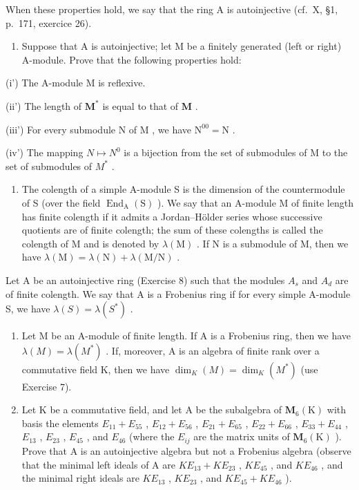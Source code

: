 When these properties hold, we say that the ring A is autoinjective (cf.~X, §1, p.~171, exercice 26).

\begin{enumerate}
\def\labelenumi{\alph{enumi})}
\tightlist
\item
  Suppose that A is autoinjective; let M be a finitely generated (left or right) A-module. Prove that the following properties hold:
\end{enumerate}

(i') The A-module M is reflexive.

(ii') The length of \(\mathbf{M}^*\) is equal to that of \(\mathbf{M}\) .

(iii') For every submodule \(\mathrm{N}\) of \(\mathrm{M}\) , we have \(\mathrm{N}^{00} = \mathrm{N}\) .

(iv') The mapping \(N \mapsto N^{0}\) is a bijection from the set of submodules of M to the set of submodules of \(M^{*}\) .

\begin{enumerate}
\def\labelenumi{\arabic{enumi})}
\setcounter{enumi}{8}
\tightlist
\item
  The colength of a simple A-module S is the dimension of the countermodule of S (over the field \(\operatorname{End}_{\mathrm{A}}(\mathrm{S})\) ). We say that an A-module M of finite length has finite colength if it admits a Jordan--Hölder series whose successive quotients are of finite colength; the sum of these colengths is called the colength of M and is denoted by \(\lambda(\mathrm{M})\) . If N is a submodule of M, then we have \(\lambda(\mathrm{M}) = \lambda(\mathrm{N}) + \lambda(\mathrm{M}/\mathrm{N})\) .
\end{enumerate}

Let A be an autoinjective ring (Exercise 8) such that the modules \(A_{s}\) and \(A_{d}\) are of finite colength. We say that A is a Frobenius ring if for every simple A-module S, we have \(\lambda(S) = \lambda(S^{*})\) .

\begin{enumerate}
\def\labelenumi{\alph{enumi})}
\item
  Let M be an A-module of finite length. If A is a Frobenius ring, then we have \(\lambda(M) = \lambda(M^{*})\) . If, moreover, A is an algebra of finite rank over a commutative field K, then we have \(\dim_K(M) = \dim_K(M^*)\) (use Exercise 7).
\item
  Let K be a commutative field, and let A be the subalgebra of \(\mathbf{M}_{6}(\mathrm{K})\) with basis the elements \(E_{11} + E_{55}\) , \(E_{12} + E_{56}\) , \(E_{21} + E_{65}\) , \(E_{22} + E_{66}\) , \(E_{33} + E_{44}\) , \(E_{13}\) , \(E_{23}\) , \(E_{45}\) , and \(E_{46}\) (where the \(E_{ij}\) are the matrix units of \(\mathbf{M}_{6}(\mathrm{K})\) ). Prove that A is an autoinjective algebra but not a Frobenius algebra (observe that the minimal left ideals of A are \(KE_{13} + KE_{23}\) , \(KE_{45}\) , and \(KE_{46}\) , and the minimal right ideals are \(KE_{13}\) , \(KE_{23}\) , and \(KE_{45} + KE_{46}\) ).
\end{enumerate}

